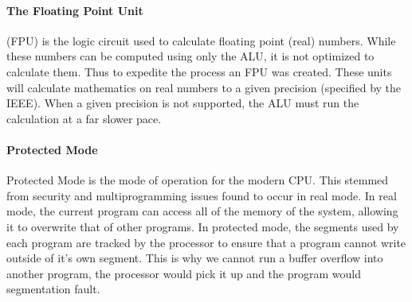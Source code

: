 				\paragraph{The Floating Point Unit}
					(FPU) is the logic circuit used to calculate floating point (real) numbers.
					While these numbers can be computed using only the ALU, it is not optimized to calculate them.
					Thus to expedite the process an FPU was created.
					These units will calculate mathematics on real numbers to a given precision (specified by the IEEE). %
					When a given precision is not supported, the ALU must run the calculation at a far slower pace.
				\paragraph{Protected Mode}
					Protected Mode is the mode of operation for the modern CPU.
					This stemmed from security and multiprogramming issues found to occur in real mode.
					In real mode, the current program can access all of the memory of the system, allowing it to overwrite that of other programs.
					In protected mode, the segments used by each program are tracked by the processor to ensure that a program cannot write outside of it's own segment.
					This is why we cannot run a buffer overflow into another program, the processor would pick it up and the program would segmentation fault.
